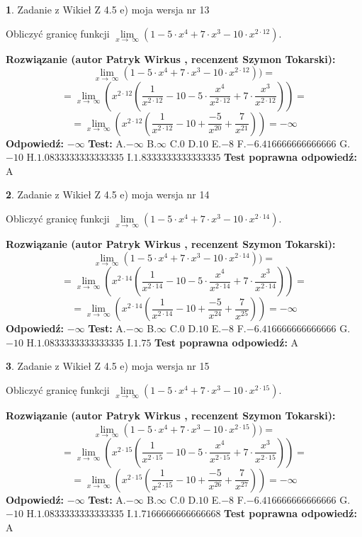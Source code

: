 \documentclass[12pt, a4paper]{article}
\theoremstyle{definition} %
\newtheorem{zad}{}
\newcommand{\zadStart}[1]{\begin{zad}#1\newline}
\newcommand{\zadStop}{\end{zad}}
\newcommand{\rozwStart}[2]{\noindent \textbf{Rozwiązanie (autor #1 , recenzent #2): }\newline}
\newcommand{\rozwStop}{\newline}
\newcommand{\odpStart}{\noindent \textbf{Odpowiedź:}\newline}
\newcommand{\odpStop}{\newline}
\newcommand{\testStart}{\noindent \textbf{Test:}\newline}
\newcommand{\testStop}{\newline}
\newcommand{\kluczStart}{\noindent \textbf{Test poprawna odpowiedź:}\newline}
\newcommand{\kluczStop}{\newline}
\begin{document}
\zadStart{Zadanie z Wikieł Z 4.5 e) moja wersja nr 13}


Obliczyć granicę funkcji  $\lim\limits_{x\to\ \infty}(1 - 5 \cdot x^{4}+7 \cdot x^{3}- 10 \cdot x^{2\cdot12})$.
\zadStop
\rozwStart{Patryk Wirkus}{Szymon Tokarski}
$$\lim\limits_{x\to\ \infty}(1 - 5 \cdot x^{4}+7 \cdot x^{3}- 10 \cdot x^{2\cdot12}))=$$
$$=\lim\limits_{x\to\ \infty}(x^{2\cdot12}(\frac{1}{x^{2\cdot12}}-10 -5 \cdot \frac{x^{4}}{x^{2\cdot12}}+7 \cdot \frac{x^{3}}{x^{2\cdot12}}))=$$
$$=\lim\limits_{x\to\ \infty}(x^{2\cdot12}(\frac{1}{x^{2\cdot12}}-10 + \frac{-5}{x^{20}}+ \frac{7}{x^{21}}))=-\infty$$
\rozwStop
\odpStart
$-\infty$
\odpStop
\testStart
A.$-\infty$ B.$\infty$ C.$0$ D.$10$ E.$-8$
F.$-6.416666666666666$ G.$-10$
H.$1.0833333333333335$
I.$1.8333333333333335$
\testStop
\kluczStart
A
\kluczStop



\zadStart{Zadanie z Wikieł Z 4.5 e) moja wersja nr 14}


Obliczyć granicę funkcji  $\lim\limits_{x\to\ \infty}(1 - 5 \cdot x^{4}+7 \cdot x^{3}- 10 \cdot x^{2\cdot14})$.
\zadStop
\rozwStart{Patryk Wirkus}{Szymon Tokarski}
$$\lim\limits_{x\to\ \infty}(1 - 5 \cdot x^{4}+7 \cdot x^{3}- 10 \cdot x^{2\cdot14}))=$$
$$=\lim\limits_{x\to\ \infty}(x^{2\cdot14}(\frac{1}{x^{2\cdot14}}-10 -5 \cdot \frac{x^{4}}{x^{2\cdot14}}+7 \cdot \frac{x^{3}}{x^{2\cdot14}}))=$$
$$=\lim\limits_{x\to\ \infty}(x^{2\cdot14}(\frac{1}{x^{2\cdot14}}-10 + \frac{-5}{x^{24}}+ \frac{7}{x^{25}}))=-\infty$$
\rozwStop
\odpStart
$-\infty$
\odpStop
\testStart
A.$-\infty$ B.$\infty$ C.$0$ D.$10$ E.$-8$
F.$-6.416666666666666$ G.$-10$
H.$1.0833333333333335$
I.$1.75$
\testStop
\kluczStart
A
\kluczStop



\zadStart{Zadanie z Wikieł Z 4.5 e) moja wersja nr 15}


Obliczyć granicę funkcji  $\lim\limits_{x\to\ \infty}(1 - 5 \cdot x^{4}+7 \cdot x^{3}- 10 \cdot x^{2\cdot15})$.
\zadStop
\rozwStart{Patryk Wirkus}{Szymon Tokarski}
$$\lim\limits_{x\to\ \infty}(1 - 5 \cdot x^{4}+7 \cdot x^{3}- 10 \cdot x^{2\cdot15}))=$$
$$=\lim\limits_{x\to\ \infty}(x^{2\cdot15}(\frac{1}{x^{2\cdot15}}-10 -5 \cdot \frac{x^{4}}{x^{2\cdot15}}+7 \cdot \frac{x^{3}}{x^{2\cdot15}}))=$$
$$=\lim\limits_{x\to\ \infty}(x^{2\cdot15}(\frac{1}{x^{2\cdot15}}-10 + \frac{-5}{x^{26}}+ \frac{7}{x^{27}}))=-\infty$$
\rozwStop
\odpStart
$-\infty$
\odpStop
\testStart
A.$-\infty$ B.$\infty$ C.$0$ D.$10$ E.$-8$
F.$-6.416666666666666$ G.$-10$
H.$1.0833333333333335$
I.$1.7166666666666668$
\testStop
\kluczStart
A
\kluczStop
\end{document}
